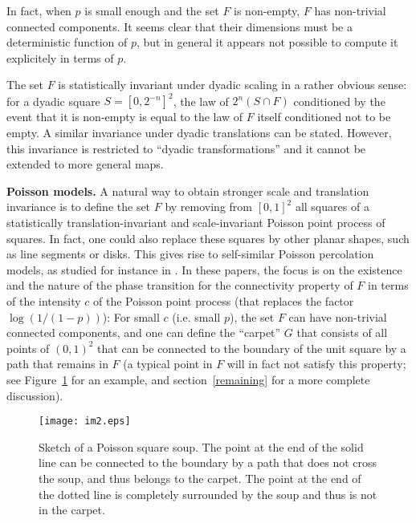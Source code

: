 \documentclass[11pt]{article}
\begin{document}
In fact, when $p$ is small enough and the set $F$ is non-empty, $F$
has non-trivial connected components.
It seems clear that their dimensions must be a deterministic function of $p$, 
but in general it appears not possible to compute it explicitely in terms of $p$. 

The set $F$ is statistically invariant under dyadic scaling 
in a rather obvious sense: for a dyadic square $S= [0, 2^{-n}]^2$, 
the law of $2^n (S \cap F)$ conditioned by the event that it is non-empty 
is equal to the law of $F$ itself conditioned not to be empty. 
A similar invariance under dyadic translations can be stated. However, this 
invariance is restricted to ``dyadic transformations'' and it cannot 
be extended to more general maps. 


\medbreak
{\bf Poisson models.}
A natural way to obtain stronger scale
and translation invariance is to define the set $F$ by
removing from $[0,1]^2$ all squares of a statistically 
translation-invariant and scale-invariant Poisson point process of squares. 
In fact, one could also replace these squares by other planar shapes, such as line segments or disks.
This gives rise to self-similar Poisson percolation models, 
as studied for instance in \cite {ZS1,ZS2,BC}. 
In these papers, the focus is on the existence and the nature of the phase transition for 
the connectivity property of $F$ in terms of the intensity $c$ of the Poisson point process (that replaces the factor $\log (1/(1-p))$):
For small $c$ (i.e.  small $p$), the set $F$ can have non-trivial connected components, and one can define 
 the ``carpet'' $G$ that consists of all points of $(0,1)^2$ that can be connected 
to the boundary of the unit square by a path that remains in $F$
(a typical point in $F$ will in fact not satisfy this property; see 
Figure~\ref{square_soup} for an example, and section~\ref{remaining} 
for a more complete discussion).

\begin{figure}\label{square_soup}
\centerline{\texttt{[image: im2.eps]}}
\caption {
Sketch of a Poisson square soup. The point at the end of the solid
line can be connected to the boundary by a path that does not cross
the soup, and thus belongs to the carpet. The point at the end of
the dotted line is completely surrounded by the soup and thus is not
in the carpet. 
}
\end {figure}
\end{document}
